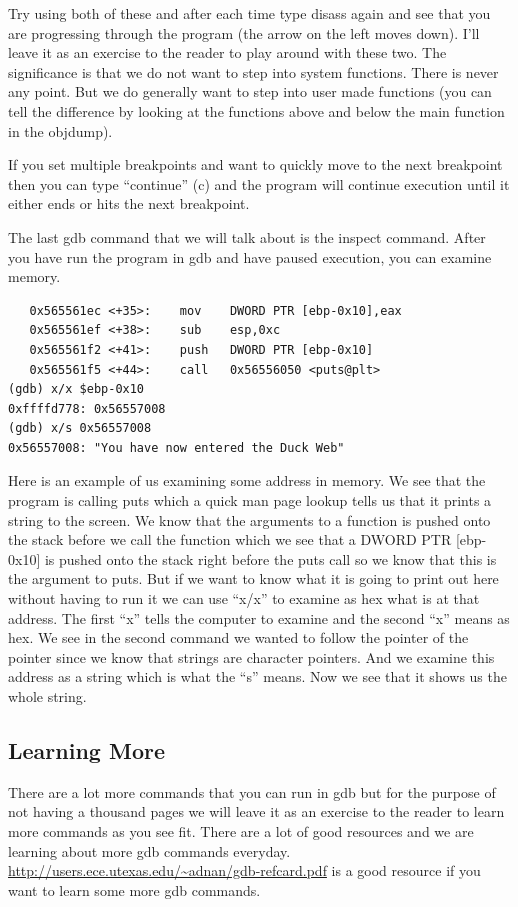 \documentclass{report}
\begin{document}
Try using both of these and after each time type disass again and see that you are progressing through the program (the arrow on the left moves down).  I'll leave it as an exercise to the reader to play around with these two.  The significance is that we do not want to step into system functions.  There is never any point.  But we do generally want to step into user made functions (you can tell the difference by looking at the functions above and below the main function in the objdump).  

If you set multiple breakpoints and want to quickly move to the next breakpoint then you can type ``continue'' (c) and the program will continue execution until it either ends or hits the next breakpoint.  

The last gdb command that we will talk about is the inspect command.  After you have run the program in gdb and have paused execution, you can examine memory.  
\begin{lstlisting}
   0x565561ec <+35>:	mov    DWORD PTR [ebp-0x10],eax
   0x565561ef <+38>:	sub    esp,0xc
   0x565561f2 <+41>:	push   DWORD PTR [ebp-0x10]
   0x565561f5 <+44>:	call   0x56556050 <puts@plt>
(gdb) x/x $ebp-0x10
0xffffd778:	0x56557008
(gdb) x/s 0x56557008
0x56557008:	"You have now entered the Duck Web"  

\end{lstlisting}
Here is an example of us examining some address in memory.  We see that the program is calling puts which a quick man page lookup tells us that it prints a string to the screen.  We know that the arguments to a function is pushed onto the stack before we call the function which we see that a DWORD PTR [ebp-0x10] is pushed onto the stack right before the puts call so we know that this is the argument to puts.  But if we want to know what it is going to print out here without having to run it we can use ``x/x'' to examine as hex what is at that address.
The first ``x'' tells the computer to examine and the second ``x'' means as hex.  We see in the second command we wanted to follow the pointer of the pointer since we know that strings are character pointers.  And we examine this address as a string which is what the ``s'' means.  Now we see that it shows us the whole string.  


\subsection{Learning More}
There are a lot more commands that you can run in gdb but for the purpose of not having a thousand pages we will leave it as an exercise to the reader to learn more commands as you see fit.  There are a lot of good resources and we are learning about more gdb commands everyday. \url{http://users.ece.utexas.edu/~adnan/gdb-refcard.pdf} is a good resource if you want to learn some more gdb commands.
\end{document}
